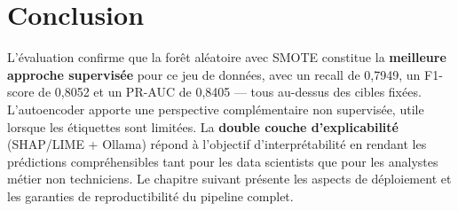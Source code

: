 \section*{Conclusion}

L'évaluation confirme que la forêt aléatoire avec SMOTE constitue la \textbf{meilleure
approche supervisée} pour ce jeu de données, avec un recall de 0,7949, un F1-score de
0,8052 et un PR-AUC de 0,8405 --- tous au-dessus des cibles fixées. L'autoencoder apporte
une perspective complémentaire non supervisée, utile lorsque les étiquettes sont limitées.
La \textbf{double couche d'explicabilité} (SHAP/LIME + Ollama) répond à l'objectif
d'interprétabilité en rendant les prédictions compréhensibles tant pour les data scientists
que pour les analystes métier non techniciens. Le chapitre suivant présente les aspects
de déploiement et les garanties de reproductibilité du pipeline complet.
